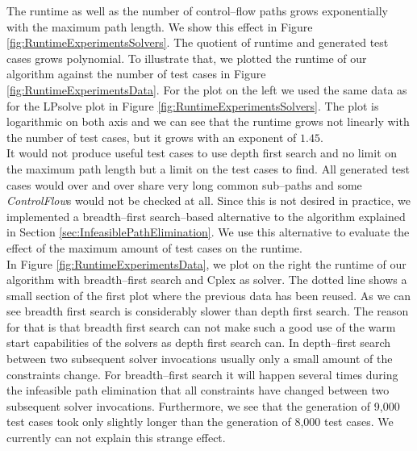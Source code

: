 \documentclass[runningheads,a4paper]{llncs}%
\newcommand{\UMLType}[1]{\textsf{\textit{#1}}} %
\begin{document}
The runtime as well as the number of control--flow paths grows exponentially with the maximum path length. We show this effect in Figure \ref{fig:RuntimeExperimentsSolvers}. The quotient of runtime and generated test cases grows polynomial. 
To illustrate that, we plotted the runtime of our algorithm against the number of test cases in Figure \ref{fig:RuntimeExperimentsData}. For the plot on the left we used the same data as for the LPsolve plot in Figure \ref{fig:RuntimeExperimentsSolvers}. The plot is logarithmic on both axis and we can see that the runtime grows not linearly with the number of test cases, but it grows with an exponent of $1.45$.\\
It would not produce useful test cases to use depth first search and no limit on the maximum path length but a limit on the test cases to find. All generated test cases would over and over share very long common sub--paths and some \UMLType{ControlFlow}s would not be checked at all. Since this is not desired in practice, we implemented a breadth--first search--based alternative to the algorithm explained in Section \ref{sec:InfeasiblePathElimination}. We use this alternative to evaluate the effect of the maximum amount of test cases on the runtime.\\
In Figure \ref{fig:RuntimeExperimentsData}, we plot on the right the runtime of our algorithm with breadth--first search and Cplex as solver. The dotted line shows a small section of the first plot where the previous data has been reused. As we can see breadth first search is considerably slower than depth first search. The reason for that is that breadth first search can not make such a good use of the warm start capabilities of the solvers as depth first search can. In depth--first search between two subsequent solver invocations usually only a small amount of the constraints change. For breadth--first search it will happen several times during the infeasible path elimination that all constraints have changed between two subsequent solver invocations. Furthermore, we see that the generation of 9,000 test cases took only slightly longer than the generation of 8,000 test cases. We currently can not explain this strange effect.
\end{document}
